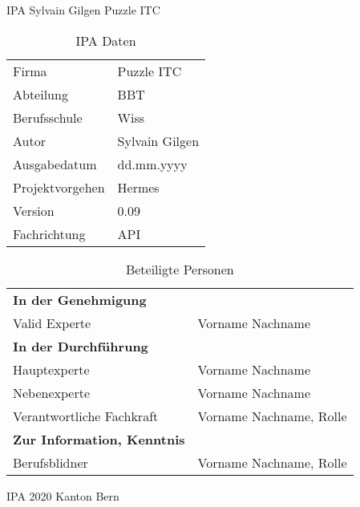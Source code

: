 \begin{titlepage}
    \Huge IPA Sylvain Gilgen Puzzle ITC\normalsize
  \bigbreak
  \begin{table}[h!]
      \begin{tabular}{|R{0.2\textwidth}|L{0.7\textwidth}|}
          \hline
            \\[12pt]
          \hline
          Firma & Puzzle ITC \\
          \hline
          Abteilung & BBT \\
          \hline
          Berufsschule & Wiss \\
          \hline
          Autor & Sylvain Gilgen \\
          \hline
          Ausgabedatum & dd.mm.yyyy \\
          \hline
          Projektvorgehen & Hermes \\
          \hline
          Version & 0.09 \\
          \hline
          Fachrichtung & API \\
          \hline
        \end{tabular}
        \caption{IPA Daten}
  \end{table}
  \begin{table}[!h]
      \begin{tabular}{|L{0.4\textwidth}|L{0.5\textwidth}|}
          \hline
            \\[12pt]
          \hline
          \textbf{In der Genehmigung} & \\
          \hline
          Valid Experte & Vorname Nachname \\
          \hline
          \textbf{In der Durchführung} & \\
          \hline
          Hauptexperte & Vorname Nachname \\
          \hline
          Nebenexperte & Vorname Nachname \\
          \hline
          Verantwortliche Fachkraft & Vorname Nachname, Rolle \\
          \hline
          \textbf{Zur Information, Kenntnis} & \\
          \hline
          Berufsblidner & Vorname Nachname, Rolle \\
          \hline
      \end{tabular}
      \caption{Beteiligte Personen}
  \end{table}
  \Huge IPA 2020 Kanton Bern
  \end{titlepage}